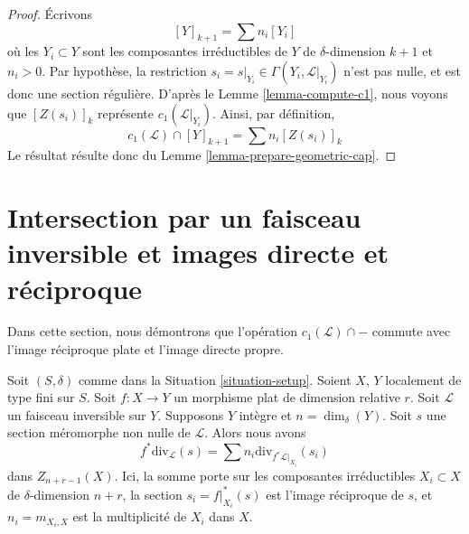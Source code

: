\begin{proof}
Écrivons
$$
[Y]_{k + 1} = \sum n_i[Y_i]
$$
où les $Y_i \subset Y$ sont les composantes irréductibles de
$Y$ de $\delta$-dimension $k + 1$ et $n_i > 0$.
Par hypothèse, la restriction
$s_i = s|_{Y_i} \in \Gamma(Y_i, \mathcal{L}|_{Y_i})$ n'est pas
nulle, et est donc une section régulière. D'après le Lemme \ref{lemma-compute-c1},
nous voyons que $[Z(s_i)]_k$ représente $c_1(\mathcal{L}|_{Y_i})$.
Ainsi, par définition,
$$
c_1(\mathcal{L}) \cap [Y]_{k + 1} = \sum n_i[Z(s_i)]_k
$$
Le résultat résulte donc du Lemme \ref{lemma-prepare-geometric-cap}.
\end{proof}




\section{Intersection par un faisceau inversible et images directe et réciproque}
\label{section-intersecting-with-divisors-push-pull}

\noindent
Dans cette section, nous démontrons que l'opération $c_1(\mathcal{L}) \cap -$
commute avec l'image réciproque plate et l'image directe propre.

\begin{lemma}
\label{lemma-prepare-flat-pullback-cap-c1}
Soit $(S, \delta)$ comme dans la Situation \ref{situation-setup}.
Soient $X$, $Y$ localement de type fini sur $S$.
Soit $f : X \to Y$ un morphisme plat de dimension relative $r$.
Soit $\mathcal{L}$ un faisceau inversible sur $Y$.
Supposons $Y$ intègre et $n = \dim_\delta(Y)$.
Soit $s$ une section méromorphe non nulle de $\mathcal{L}$.
Alors nous avons
$$
f^*\text{div}_\mathcal{L}(s) = \sum n_i\text{div}_{f^*\mathcal{L}|_{X_i}}(s_i)
$$
dans $Z_{n + r - 1}(X)$. Ici, la somme porte sur les composantes
irréductibles $X_i \subset X$ de $\delta$-dimension $n + r$,
la section $s_i = f|_{X_i}^*(s)$ est l'image réciproque de $s$, et
$n_i = m_{X_i, X}$ est la multiplicité de $X_i$ dans $X$.
\end{lemma}

